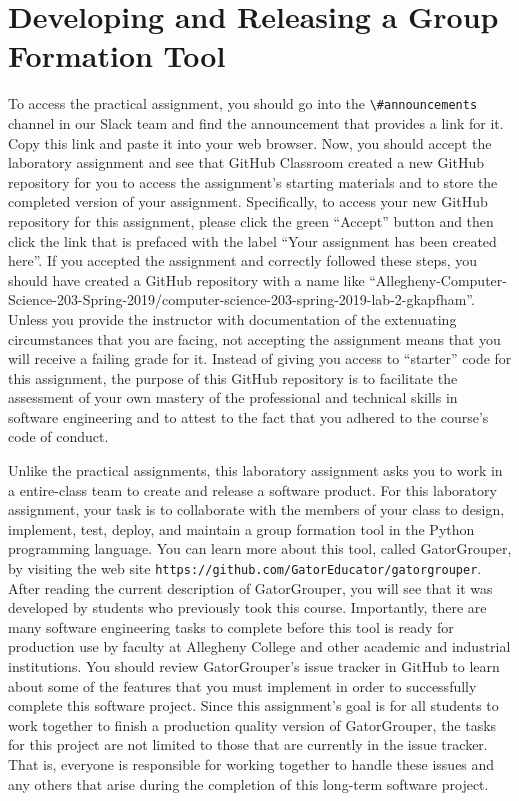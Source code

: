 \documentclass[11pt]{article}
\newcommand{\url}[1]{\lstinline{#1}}
\newcommand{\channel}[1]{\lstinline{#1}}
\begin{document}
\section*{Developing and Releasing a Group Formation Tool}


To access the practical assignment, you should go into the
\channel{\#announcements} channel in our Slack team and find the announcement
that provides a link for it. Copy this link and paste it into your web browser.
Now, you should accept the laboratory assignment and see that GitHub Classroom
created a new GitHub repository for you to access the assignment's starting
materials and to store the completed version of your assignment. Specifically,
to access your new GitHub repository for this assignment, please click the green
``Accept'' button and then click the link that is prefaced with the label ``Your
assignment has been created here''. If you accepted the assignment and correctly
followed these steps, you should have created a GitHub repository with a name
like
``Allegheny-Computer-Science-203-Spring-2019/computer-science-203-spring-2019-lab-2-gkapfham''.
Unless you provide the instructor with documentation of the extenuating
circumstances that you are facing, not accepting the assignment means that you
will receive a failing grade for it.
%
Instead of giving you access to ``starter'' code for this assignment, the
purpose of this GitHub repository is to facilitate the assessment of your own
mastery of the professional and technical skills in software engineering and to
attest to the fact that you adhered to the course's code of conduct.


Unlike the practical assignments, this laboratory assignment asks you to work in
a entire-class team to create and release a software product.
%
For this laboratory assignment, your task is to collaborate with the members of
your class to design, implement, test, deploy, and maintain a group formation
tool in the Python programming language.
%
You can learn more about this tool, called GatorGrouper, by visiting the web
site \url{https://github.com/GatorEducator/gatorgrouper}. After reading the
current description of GatorGrouper, you will see that it was developed by
students who previously took this course.
%
Importantly, there are many software engineering tasks to complete before this
tool is ready for production use by faculty at Allegheny College and other
academic and industrial institutions. You should review GatorGrouper's issue
tracker in GitHub to learn about some of the features that you must implement in
order to successfully complete this software project. Since this assignment's
goal is for all students to work together to finish a production quality version
of GatorGrouper, the tasks for this project are not limited to those that are
currently in the issue tracker. That is, everyone is responsible for working
together to handle these issues and any others that arise during the completion
of this long-term software project.
\end{document}
